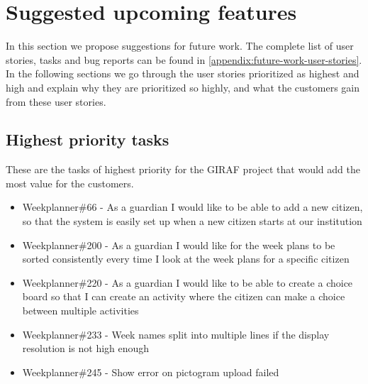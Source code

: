 \section{Suggested upcoming features}\label{SuggestedUpcomingFeatures}
In this section we propose suggestions for future work. 
The complete list of user stories, tasks and bug reports can be found in \autoref{appendix:future-work-user-stories}.
In the following sections we go through the user stories prioritized as highest and high and explain why they are prioritized so highly, and what the customers gain from these user stories.

\subsection{Highest priority tasks}\label{highest-priority-tasks}
These are the tasks of highest priority for the GIRAF project that would add the most value for the customers.

\begin{itemize}
    \item Weekplanner\#66 - As a guardian I would like to be able to add a new citizen, so that the system is easily set up when a new citizen starts at our institution
    \item Weekplanner\#200 - As a guardian I would like for the week plans to be sorted consistently every time I look at the week plans for a specific citizen
    \item Weekplanner\#220 - As a guardian I would like to be able to create a choice board so that I can create an activity where the citizen can make a choice between multiple activities 
    \item Weekplanner\#233 - Week names split into multiple lines if the display resolution is not high enough 
    \item Weekplanner\#245 - Show error on pictogram upload failed
\end{itemize}

